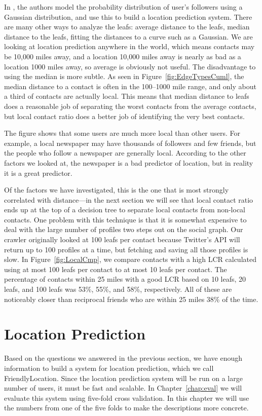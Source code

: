 \documentclass[letterpaper]{article}
\newcommand{\flchap}[1]{\section{#1}}
\begin{document}
In \cite{li2012towards}, the authors model the probability distribution of
user's followers using a Gaussian distribution, and use this to build a
location prediction system.
%
There are many other ways to analyze the leafs: average distance to the leafs,
median distance to the leafs, fitting the distances to a curve such as a
Gaussian.
%
We are looking at location prediction anywhere in the world, which means
contacts may be 10,000 miles away, and a location 10,000 miles away is nearly
as bad as a location 1000 miles away, so average is obviously not useful.
%
The disadvantage to using the median is more subtle.
%
As seen in Figure~\ref{fig:EdgeTypesCuml}, the median distance to a contact is
often in the 100--1000 mile range, and only about a third of contacts are
actually local.
%
This means that median distance to leafs does a reasonable job of separating the
worst contacts from the average contacts, but local contact ratio does a better
job of identifying the very best contacts.

The figure shows that some users are much more local than other users.
For example, a local newspaper may have thousands of followers and few friends,
but the people who follow a newspaper are generally local.
According to the other factors we looked at, the newspaper is a bad predictor
of location, but in reality it is a great predictor.

Of the factors we have investigated, this is the one that is most strongly
correlated with distance---in the next section we will see that local contact
ratio ends up at the top of a decision tree to separate local contacts from
non-local contacts.
%
One problem with this technique is that it is somewhat expensive to deal with
the large number of profiles two steps out on the social graph.
%
Our crawler originally looked at 100 leafs per contact because Twitter's API
will return up to 100 profiles at a time, but fetching and saving all those
profiles is slow.
%
In Figure~\ref{fig:LocalCmp}, we compare contacts with a high LCR calculated
using at most 100 leafs per contact to at most 10 leafs per contact.
%
The percentage of contacts within 25 miles with a good LCR based on 10 leafs,
20 leafs, and 100 leafs was 53\%, 55\%, and 58\%, respectively.
%
All of these are noticeably closer than reciprocal friends who are within 25
miles 38\% of the time.

\flchap{Location Prediction}

Based on the questions we answered in the previous section, we have enough
information to build a system for location prediction, which we call
FriendlyLocation.
%
Since the location prediction system will be run on a large number of users,
it must be fast and scalable.
%
In Chapter~\ref{chap:eval} we will evaluate this system using five-fold cross
validation.
%
In this chapter we will use the numbers from one of the five folds to make
the descriptions more concrete.
\end{document}

